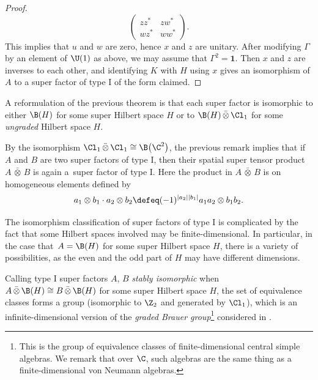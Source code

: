 \begin{proof}
\begin{equation*}
 \begin{pmatrix} zz^* & z w^* \\ wz^* & ww^* \end{pmatrix}.
 \end{equation*}
 This implies that $u$ and $w$ are zero, hence $x$ and $z$ are unitary.
 After modifying $\Gamma$ by an element of $\U(1)$ as above, we may assume that $\Gamma^2 = \mathbf{1}$.
 Then $x$ and $z$ are inverses to each other, and identifying $K$ with $H$ using $x$ gives an isomorphism of $A$ to a super factor of type I of the form claimed.
\end{proof}

\begin{Remark}
A reformulation of the previous theorem is that each super factor is isomorphic to either $\B(H)$ for some super Hilbert space $H$ or to $\B(H) \,\bar{\otimes}\, \Cl_1$ for some \emph{ungraded} Hilbert space $H$.
\end{Remark}

\begin{Remark} \label{RemarkTensorProductFactor}
By the isomorphism $\Cl_1 \,\bar{\otimes}\, \Cl_1 \cong \B\big(\C^2\big)$, the previous remark implies that if $A$ and $B$ are two super factors of type I, then their spatial super tensor product $A \,\bar{\otimes}\, B$ is again a~super factor of type I. Here the product in $A \,\bar{\otimes}\, B$ is on homogeneous elements defined by
\begin{equation*}
a_1 \otimes b_1 \cdot a_2 \otimes b_2 \defeq (-1)^{|a_2||b_1|} a_1 a_2 \otimes b_1 b_2.
\end{equation*}
\end{Remark}

\begin{Remark}
The isomorphism classification of super factors of type I is complicated by the fact that some Hilbert spaces involved may be finite-dimensional.
In particular, in the case that~$A = \B(H)$ for some super Hilbert space $H$, there is a variety of possibilities, as the even and the odd part of $H$ may have different dimensions.

Calling type I super factors $A$, $B$ \emph{stably isomorphic} when $A \,\bar{\otimes}\, \B(H) \cong B \,\bar{\otimes}\, \B(H)$ for some super Hilbert space $H$, the set of equivalence classes forms a group (isomorphic to $\Z_2$ and generated by $\Cl_1$), which is an infinite-dimensional version of the \emph{graded Brauer group}\footnote{This is the group of equivalence classes of finite-dimensional central simple algebras.
We remark that over $\C$, such algebras are the same thing as a finite-dimensional von Neumann algebras.} considered in \cite{WallGradedBrauer}.
\end{Remark}

